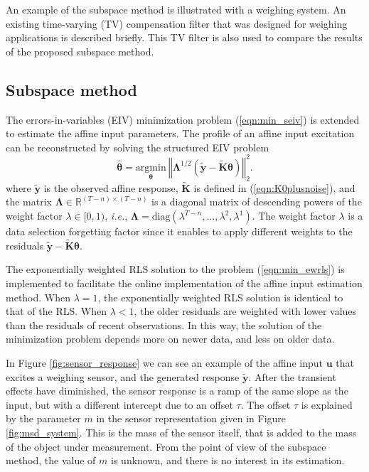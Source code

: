 An example of the subspace method is illustrated with a weighing system.
An existing time-varying (TV) compensation filter that was designed for weighing applications is described briefly.
This TV filter is also used to compare the results of the proposed subspace method.


\subsection{Subspace method}
The errors-in-variables (EIV) minimization problem (\ref{eqn:min_seiv}) is extended to estimate the affine input parameters.
The profile of an affine input excitation can be reconstructed by solving the structured EIV problem  
\begin{equation} \widehat{\bm{\theta}} = \underset{\bm{\theta}}{\mathrm{argmin}} \ \left\Vert \bm{\Lambda}^{1/2} \left( \widetilde{\mathbf{y}} - \widetilde{\mathbf{K}} \bm{\theta} \right) \right\Vert^2_2 . \label{eqn:min_ewrls} \end{equation}
where $\widetilde{\mathbf{y}}$ is the observed affine response, $\widetilde{\mathbf{K}}$ is defined in (\ref{eqn:K0plusnoise}), and
the matrix $\bm{\Lambda} \in \mathbb{R}^{(T-n) \times (T-n)}$ is a diagonal matrix of descending powers of the weight factor $\lambda \in [0, 1)$, \textit{i.e.},  $\bm{\Lambda} = \mathrm{diag}\left(\lambda^{T-n}, \ldots, \lambda^2, \lambda^1 \right)$.
The weight factor $\lambda$ is a data selection forgetting factor since it enables to apply different weights to the residuals $\widetilde{\mathbf{y}} - \widetilde{\mathbf{K}} \bm{\theta}$.

The exponentially weighted RLS solution to the problem (\ref{eqn:min_ewrls}) is implemented to facilitate the online implementation of the affine input estimation method.
When $\lambda=1$, the exponentially weighted RLS solution is identical to that of the RLS.
When $\lambda<1$, the older residuals are weighted with lower values than the residuals of recent observations.
In this way, the solution of the minimization problem depends more on newer data, and less on older data. 

In Figure \ref{fig:sensor_response} we can see an example of the affine input $\mathbf{u}$ that excites a weighing sensor, and the generated response $\widetilde{\mathbf{y}}$.
After the transient effects have diminished, the sensor response is a ramp of the same slope as the input, but with a different intercept due to an offset $\tau$.
The offset $\tau$ is explained by the parameter $m$ in the sensor representation given in Figure \ref{fig:msd_system}.
This is the mass of the sensor itself, that is added to the mass of the object under measurement.	
From the point of view of the subspace method, the value of $m$ is unknown, and there is no interest in its estimation.

